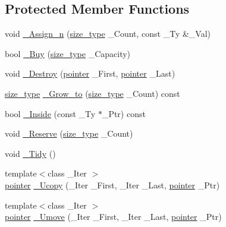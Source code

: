 \subsection*{Protected Member Functions}
\begin{DoxyCompactItemize}
\item 
void \hyperlink{classvector_af6ae46542130d94f62eaca2f150c1a07}{\+\_\+\+Assign\+\_\+n} (\hyperlink{classvector_ac975e84f5d6c2fe2267bb354a85818af}{size\+\_\+type} \+\_\+\+Count, const \+\_\+\+Ty \&\+\_\+\+Val)
\item 
bool \hyperlink{classvector_a8b82acf390655c3df75716064d30862a}{\+\_\+\+Buy} (\hyperlink{classvector_ac975e84f5d6c2fe2267bb354a85818af}{size\+\_\+type} \+\_\+\+Capacity)
\item 
void \hyperlink{classvector_adc2e4d8e694e03595c8c12ebb0e724b6}{\+\_\+\+Destroy} (\hyperlink{classvector_a7f69707c8f1cc638260b523d48793523}{pointer} \+\_\+\+First, \hyperlink{classvector_a7f69707c8f1cc638260b523d48793523}{pointer} \+\_\+\+Last)
\item 
\hyperlink{classvector_ac975e84f5d6c2fe2267bb354a85818af}{size\+\_\+type} \hyperlink{classvector_a6f65f39c49d359c1d9dd33fba88ca182}{\+\_\+\+Grow\+\_\+to} (\hyperlink{classvector_ac975e84f5d6c2fe2267bb354a85818af}{size\+\_\+type} \+\_\+\+Count) const 
\item 
bool \hyperlink{classvector_a1d9754111e0124a045277acb78e2f2e5}{\+\_\+\+Inside} (const \+\_\+\+Ty $\ast$\+\_\+\+Ptr) const 
\item 
void \hyperlink{classvector_ae2e64058c9c07a661f3c20a01e13b723}{\+\_\+\+Reserve} (\hyperlink{classvector_ac975e84f5d6c2fe2267bb354a85818af}{size\+\_\+type} \+\_\+\+Count)
\item 
void \hyperlink{classvector_a90176ebd5790a9cbc1d4664cd55774b2}{\+\_\+\+Tidy} ()
\item 
{\footnotesize template$<$class \+\_\+\+Iter $>$ }\\\hyperlink{classvector_a7f69707c8f1cc638260b523d48793523}{pointer} \hyperlink{classvector_a1faab67c07f4d062e65447a917783255}{\+\_\+\+Ucopy} (\+\_\+\+Iter \+\_\+\+First, \+\_\+\+Iter \+\_\+\+Last, \hyperlink{classvector_a7f69707c8f1cc638260b523d48793523}{pointer} \+\_\+\+Ptr)
\item 
{\footnotesize template$<$class \+\_\+\+Iter $>$ }\\\hyperlink{classvector_a7f69707c8f1cc638260b523d48793523}{pointer} \hyperlink{classvector_a7fb2c85958dd62d4cb404372e592592a}{\+\_\+\+Umove} (\+\_\+\+Iter \+\_\+\+First, \+\_\+\+Iter \+\_\+\+Last, \hyperlink{classvector_a7f69707c8f1cc638260b523d48793523}{pointer} \+\_\+\+Ptr)

\end{DoxyCompactItemize}
